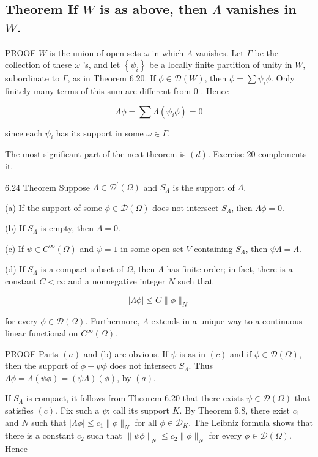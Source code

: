\documentclass[10pt]{article}
\begin{document}
\subsection{Theorem If $W$ is as above, then $\Lambda$ vanishes in $W$.}
PROOF $W$ is the union of open sets $\omega$ in which $\Lambda$ vanishes. Let $\Gamma$ be the collection of these $\omega$ 's, and let $\left\{\psi_{i}\right\}$ be a locally finite partition of unity in $W$, subordinate to $\Gamma$, as in Theorem 6.20. If $\phi \in \mathscr{D}(W)$, then $\phi=\sum \psi_{i} \phi$. Only finitely many terms of this sum are different from 0 . Hence

$$
\Lambda \phi=\sum \Lambda\left(\psi_{i} \phi\right)=0
$$

since each $\psi_{i}$ has its support in some $\omega \in \Gamma$.

The most significant part of the next theorem is $(d)$. Exercise 20 complements it.

6.24 Theorem Suppose $\Lambda \in \mathscr{D}^{\prime}(\Omega)$ and $S_{\Lambda}$ is the support of $\Lambda$.

(a) If the support of some $\phi \in \mathscr{D}(\Omega)$ does not intersect $S_{\Lambda}$, ihen $\Lambda \phi=0$.

(b) If $S_{\Lambda}$ is empty, then $\Lambda=0$.

(c) If $\psi \in C^{\infty}(\Omega)$ and $\psi=1$ in some open set $V$ containing $S_{\Lambda}$, then $\psi \Lambda=\Lambda$.

(d) If $S_{\Lambda}$ is a compact subset of $\Omega$, then $\Lambda$ has finite order; in fact, there is a constant $C<\infty$ and a nonnegative integer $N$ such that

$$
|\Lambda \phi| \leq C\|\phi\|_{N}
$$

for every $\phi \in \mathscr{D}(\Omega)$. Furthermore, $\Lambda$ extends in a unique way to a continuous linear functional on $C^{\infty}(\Omega)$.

PROOF Parts $(a)$ and (b) are obvious. If $\psi$ is as in $(c)$ and if $\phi \in \mathscr{D}(\Omega)$, then the support of $\phi-\psi \phi$ does not intersect $S_{\Lambda}$. Thus $\Lambda \phi=\Lambda(\psi \phi)=(\psi \Lambda)(\phi)$, by $(a)$.

If $S_{\Lambda}$ is compact, it follows from Theorem 6.20 that there exists $\psi \in \mathscr{D}(\Omega)$ that satisfies $(c)$. Fix such a $\psi$; call its support $K$. By Theorem 6.8, there exist $c_{1}$ and $N$ such that $|\Lambda \phi| \leq c_{1}\|\phi\|_{N}$ for all $\phi \in \mathscr{D}_{K}$. The Leibniz formula shows that there is a constant $c_{2}$ such that $\|\psi \phi\|_{N} \leq c_{2}\|\phi\|_{N}$ for every $\phi \in \mathscr{D}(\Omega)$. Hence
\end{document}
